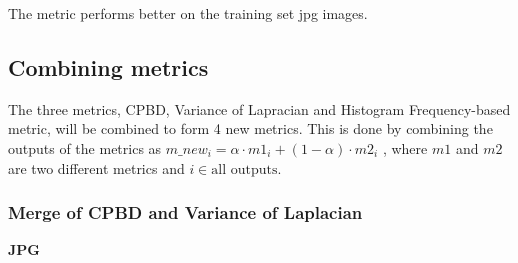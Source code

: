 The metric performs better on the training set jpg images.



\subsection{Combining metrics}
The three metrics, CPBD, Variance of Lapracian and Histogram Frequency-based metric, will be combined to form 4 new metrics. This is done by combining the outputs of the metrics as 
$m\_new_i = \alpha \cdot m1_i + (1-\alpha) \cdot m2_i$
, where $m1$ and $m2$ are two different metrics and $i \in \text{all outputs}$.

\subsubsection{Merge of CPBD and Variance of Laplacian}
\textbf{JPG}\\
